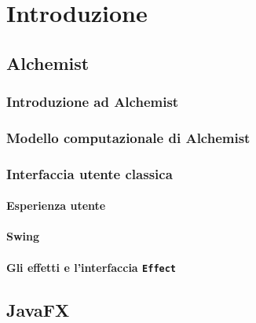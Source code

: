 

\chapter{Introduzione}\label{ch:intro}
    \section{Alchemist}\label{sec:alchemist}

        \subsection{Introduzione ad Alchemist}\label{sub:introAlchemist}
        \subsection{Modello computazionale di Alchemist}\label{sub:modelloComputazionale}
        \subsection{Interfaccia utente classica}\label{sub:prevGui}
            \subsubsection{Esperienza utente}\label{subsub:prevUx}
            \subsubsection{Swing}\label{subsub:swing}
            \subsubsection{Gli effetti e l'interfaccia \texttt{Effect}}\label{subsub:effect}
    \section{JavaFX}\label{sec:jfx}
